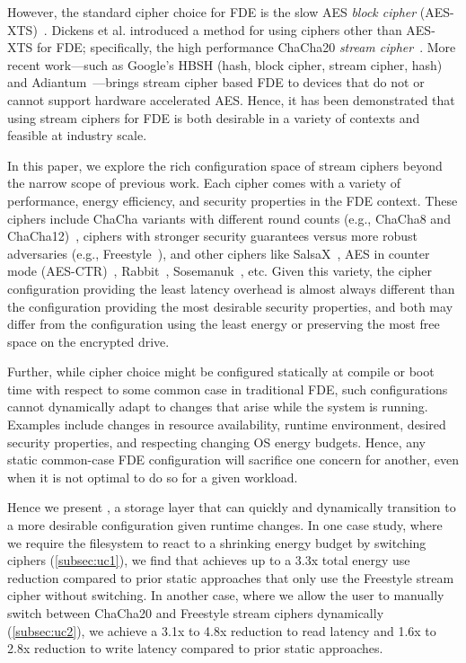 However, the standard cipher choice for FDE is the slow AES \emph{block cipher}
(AES-XTS)~\cite{XTS, XTSComments, NISTXTS}. Dickens et al. introduced a method
for using ciphers other than AES-XTS for FDE; specifically, the high performance
ChaCha20 \emph{stream cipher}~\cite{StrongBox, ChaCha20}. More recent
work---such as Google's HBSH (hash, block cipher, stream cipher, hash) and
Adiantum~\cite{Adiantum}---brings stream cipher based FDE to devices that do not
or cannot support hardware accelerated AES. Hence, it has been demonstrated that
using stream ciphers for FDE is both desirable in a variety of contexts and
feasible at industry scale.

In this paper, we explore the rich configuration space of stream
ciphers beyond the narrow scope of previous work. Each cipher comes
with a variety of performance, energy efficiency, and security
properties in the FDE context.  These ciphers include ChaCha variants
with different round counts (e.g., ChaCha8 and
ChaCha12)~\cite{ChaCha20}, ciphers with stronger security guarantees
versus more robust adversaries (e.g., Freestyle~\cite{Freestyle}), and
other ciphers like SalsaX~\cite{SalsaX}, AES in counter mode
(AES-CTR)~\cite{AESCTR}, Rabbit~\cite{Rabbit},
Sosemanuk~\cite{Sosemanuk}, etc.  Given this variety, the cipher
configuration providing the least latency overhead is almost always
different than the configuration providing the most desirable security
properties, and both may differ from the configuration using the least
energy or preserving the most free space on the encrypted drive.

Further, while cipher choice might be configured statically at compile or boot
time with respect to some common case in traditional FDE, such configurations
cannot dynamically adapt to changes that arise while the system is running.
Examples include changes in resource availability, runtime environment, desired
security properties, and respecting changing OS energy budgets. Hence, any
static common-case FDE configuration will sacrifice one concern for another,
even when it is not optimal to do so for a given workload.

Hence we present \sys{}, a storage layer that can quickly and dynamically
transition to a more desirable configuration given runtime changes. In one case
study, where we require the filesystem to react to a shrinking energy budget by
switching ciphers (\cref{subsec:uc1}), we find that \sys{} achieves up to a
3.3x total energy use reduction compared to prior static approaches that only
use the Freestyle stream cipher without switching. In another case, where we
allow the user to manually switch between ChaCha20 and Freestyle stream ciphers
dynamically (\cref{subsec:uc2}), we achieve a 3.1x to 4.8x reduction to read
latency and 1.6x to 2.8x reduction to write latency compared to prior static
approaches.

